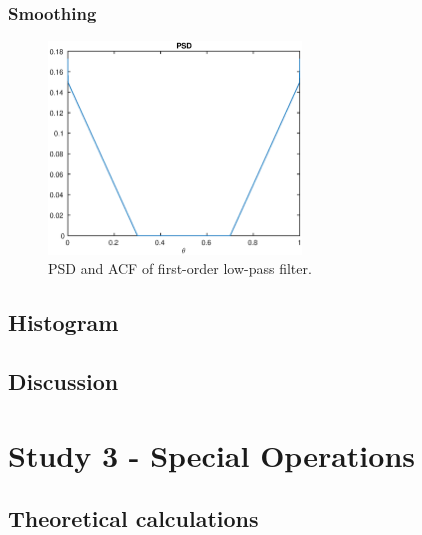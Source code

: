 \documentclass[a4paper,12pt]{article}
\begin{document}
\subsubsection{Smoothing}
\begin{figure}[h]
\centering
\includegraphics[width=0.6\textwidth]{bilder/Lab2/Lab2fig1.eps}
\caption{PSD and ACF of first-order low-pass filter.}
\label{fig:Lab1fig1}
\end{figure}


\subsection{Histogram}



\subsection{Discussion}


\section{Study 3 - Special Operations}


\subsection{Theoretical calculations}

\end{document}
